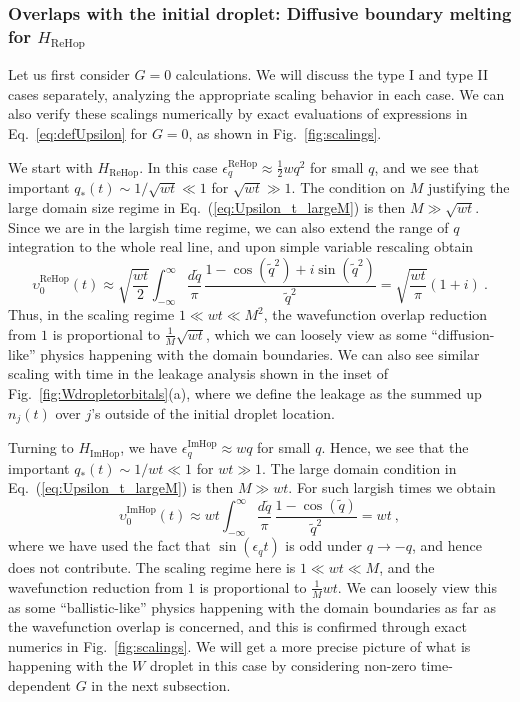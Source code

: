 \documentclass[prx,letterpaper,aps,superscriptaddress,floatfix,twocolumn,nofootinbib]{revtex4-2}
\theoremstyle{definition}
\begin{document}
%
\subsubsection{Overlaps with the initial droplet:
%
Diffusive boundary melting for $H_{\text{ReHop}}$}
%
Let us first consider $G = 0$ calculations.
%
We will discuss the type I and type II cases separately, analyzing the appropriate scaling behavior in each case.
%
We can also verify these scalings numerically by exact evaluations of expressions in Eq.~\eqref{eq:defUpsilon} for $G = 0$, as shown in Fig.~\ref{fig:scalings}.
%

%
We start with $H_{\text{ReHop}}$.
%
In this case $\epsilon_q^{\text{ReHop}} \approx \frac{1}{2} w q^2$ for small $q$, and we see that important $q_*(t) \sim 1/\sqrt{wt} \ll 1$ for $\sqrt{wt} \gg 1$.
%
The condition on $M$ justifying the large domain size regime in Eq.~(\ref{eq:Upsilon_t_largeM}) is then $M \gg \sqrt{wt}$. 
%
Since we are in the largish time regime, we can also extend the range of $q$ integration to the whole real line, and upon simple variable rescaling obtain
\begin{equation}
\upsilon^{\text{ReHop}}_0(t) \approx \sqrt{\frac{wt}{2}} \int_{-\infty}^\infty \frac{d\tilde{q}}{\pi}\, \frac{1 - \cos(\tilde{q}^2) + i \sin(\tilde{q}^2)}{\tilde{q}^2} = \sqrt{\frac{wt}{\pi}} (1 + i) ~.
\label{eq:upsilonReHop}
\end{equation}
%
Thus, in the scaling regime $1 \ll wt \ll M^2$, the wavefunction overlap reduction from $1$ is proportional to $\frac{1}{M} \sqrt{wt}$, which we can loosely view as some ``diffusion-like'' physics happening with the domain boundaries.
%
We can also see similar scaling with time in the leakage analysis shown in the inset of Fig.~\ref{fig:Wdropletorbitals}(a), where we define the leakage as the summed up $n_j(t)$ over $j$'s outside of the initial droplet location.
%

%
Turning to $H_{\text{ImHop}}$, we have $\epsilon_q^{\text{ImHop}} \approx wq$ for small $q$.
%
Hence, we see that the important $q_*(t) \sim 1/wt \ll 1$ for $wt \gg 1$.
%
The large domain condition in Eq.~(\ref{eq:Upsilon_t_largeM}) is then $M \gg wt$.
%
For such largish times we obtain
\begin{equation}
\upsilon^{\text{ImHop}}_0(t) \approx wt \int_{-\infty}^\infty \frac{d\tilde{q}}{\pi} \, \frac{1 - \cos(\tilde{q})}{\tilde{q}^2} = wt ~,
\label{eq:upsilonImHop}
\end{equation}
where we have used the fact that $\sin(\epsilon_q t)$ is odd under $q \rightarrow -q$, and hence does not contribute.
%
The scaling regime here is $1 \ll wt \ll M$, and the wavefunction reduction from $1$ is proportional to $\frac{1}{M} wt$.
%
We can loosely view this as some ``ballistic-like'' physics happening with the domain boundaries as far as the wavefunction overlap is concerned, and this is confirmed through exact numerics in Fig.~\ref{fig:scalings}.
%
We will get a more precise picture of what is happening with the $W$ droplet in this case by considering non-zero time-dependent $G$ in the next subsection.
%
\end{document}
